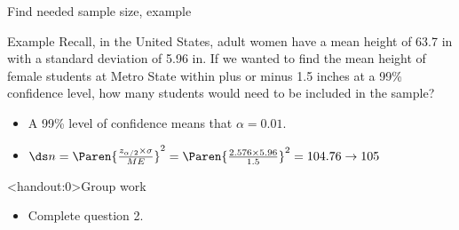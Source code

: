 \documentclass[xcolor=table, handout]{beamer}
\begin{document}
\begin{frame}{Find needed sample size, example}
\begin{exampleblock}{Example}
Recall, in the United States, adult women have a mean height of 63.7 in with a standard deviation of 5.96 in. If we wanted to find the mean height of female students at Metro State within plus or minus 1.5 inches at a 99\% confidence level, how many students would need to be included in the sample?

\begin{itemize}
\pause\item A 99\% level of confidence means that $\alpha = 0.01$.
\pause\item $\ds n = \Paren{\frac{z_{\alpha/2} \times \sigma}{ME}}^2= \Paren{\frac{2.576 \times 5.96}{1.5}}^2 = 104.76 \to 105$
\end{itemize}
\end{exampleblock}
\end{frame}

\begin{frame}<handout:0>{Group work}
\begin{block}{}
\large
\begin{itemize}
\item Complete question 2.
\end{itemize}
\end{block}
\end{frame}
\end{document}
